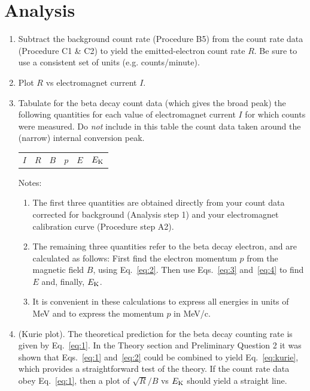 \section{Analysis}

\begin{enumerate}

\item Subtract the background count rate (Procedure B5) from the count
rate data (Procedure C1 \& C2) to yield the emitted-electron count rate
$R$.  Be sure to use a consistent set of units (e.g. counts/minute).

\item Plot $R$ vs electromagnet current $I$.

\item Tabulate for the beta decay count data (which gives the broad peak) the
  following quantities for each value of electromagnet current $I$ for which
  counts were measured.  Do {\em not} include in this table the count data taken
  around the (narrow) internal conversion peak.

\begin{tabular}{c c c c c c}
$I$ & $R$ & $B$ & $p$ & $E$ & $E_{\rm K}$\\
\end{tabular}

Notes:
\begin{enumerate}
\item The first three quantities are obtained directly from your count
data corrected for background (Analysis step 1) and your electromagnet
calibration curve (Procedure step A2).

\item The remaining three quantities refer to the beta decay electron,
and are calculated as follows:  First find the electron momentum $p$ from the magnetic field $B$,
using Eq.~\ref{eq:2}.  Then use Eqs.~\ref{eq:3} and~\ref{eq:4} to find $E$ and, finally,
$E_{\rm K}$.

\item It is convenient in these calculations to express all energies in units of
  MeV and to express the momentum $p$ in MeV/c.
\end{enumerate}

\item (Kurie plot).  The theoretical prediction for the beta
decay counting rate is given by Eq.~\ref{eq:1}.  In the Theory section and
Preliminary Question 2 it was shown that Eqs.~\ref{eq:1} and~\ref{eq:2} could be
combined  to yield Eq.~\ref{eq:kurie}, which provides a straightforward test of
the theory.  If the count rate data obey Eq.~\ref{eq:1}, then a plot of
$\sqrt{R}/B$ vs $E_{\rm K}$ should yield a straight line.


\end{enumerate}
